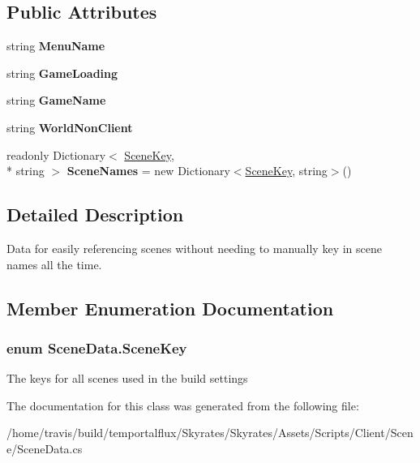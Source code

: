 \subsection*{Public Attributes}
\begin{DoxyCompactItemize}
\item 
\hypertarget{class_scene_data_afbb76c0a95550a3ae6f78f792e0a9bd2}{string {\bfseries Menu\-Name}}\label{class_scene_data_afbb76c0a95550a3ae6f78f792e0a9bd2}

\item 
\hypertarget{class_scene_data_a4b7849afd57de2994089d08ea4d7b2d4}{string {\bfseries Game\-Loading}}\label{class_scene_data_a4b7849afd57de2994089d08ea4d7b2d4}

\item 
\hypertarget{class_scene_data_a7cc8b24dcd8903bb3199be8297def99d}{string {\bfseries Game\-Name}}\label{class_scene_data_a7cc8b24dcd8903bb3199be8297def99d}

\item 
\hypertarget{class_scene_data_a6308a34931e2539f7bb35de881bb9654}{string {\bfseries World\-Non\-Client}}\label{class_scene_data_a6308a34931e2539f7bb35de881bb9654}

\item 
\hypertarget{class_scene_data_ae3973806664f840746168615a790c1f2}{readonly Dictionary$<$ \hyperlink{class_scene_data_a79d397b3deef242a865470283d96f2e6}{Scene\-Key}, \\*
string $>$ {\bfseries Scene\-Names} = new Dictionary$<$\hyperlink{class_scene_data_a79d397b3deef242a865470283d96f2e6}{Scene\-Key}, string$>$()}\label{class_scene_data_ae3973806664f840746168615a790c1f2}

\end{DoxyCompactItemize}


\subsection{Detailed Description}
Data for easily referencing scenes without needing to manually key in scene names all the time. 



\subsection{Member Enumeration Documentation}
\hypertarget{class_scene_data_a79d397b3deef242a865470283d96f2e6}{
\subsubsection[{Scene\-Key}]{\setlength{\rightskip}{0pt plus 5cm}enum {\bf Scene\-Data.\-Scene\-Key}}}\label{class_scene_data_a79d397b3deef242a865470283d96f2e6}


The keys for all scenes used in the build settings 



The documentation for this class was generated from the following file\-:\begin{DoxyCompactItemize}
\item 
/home/travis/build/temportalflux/\-Skyrates/\-Skyrates/\-Assets/\-Scripts/\-Client/\-Scene/Scene\-Data.\-cs\end{DoxyCompactItemize}

